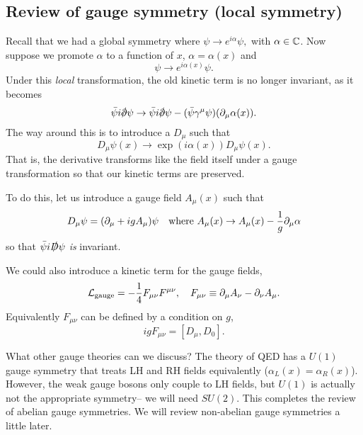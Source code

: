 \subsection*{Review of gauge symmetry (local symmetry)}
Recall that we had a global symmetry where $\psi \to e^{i\alpha}\psi,$ with $\alpha\in \mathbb{C}$. Now suppose we promote $\alpha$ to a function of $x$, $\alpha=\alpha(x)$ and
\begin{equation}
    \psi\to e^{i\alpha(x)}\psi.
\end{equation}
Under this \emph{local} transformation, the old kinetic term is no longer invariant, as it becomes
\begin{equation}
    \bar \psi i \slashed{\p}\psi \to \bar \psi i \slashed{\p}\psi - (\bar \psi \gamma^\mu \psi)(\p_\mu \alpha(x)).
\end{equation}
The way around this is to introduce a  $D_\mu$ such that
\begin{equation}
    D_\mu\psi(x) \to \exp(i\alpha(x))D_\mu \psi(x).
\end{equation}
That is, the derivative transforms like the field itself under a gauge transformation so that our kinetic terms are preserved.

To do this, let us introduce a gauge field $A_\mu(x)$ such that
\begin{equation}
    D_\mu\psi = (\partial_\mu + i g A_\mu)\psi\quad
    \text{where }A_\mu(x)\to A_\mu(x)-\frac{1}{g} \partial_\mu \alpha
\end{equation}
so that $\bar \psi i \slashed{D}\psi$ \emph{is} invariant.

We could also introduce a kinetic term for the gauge fields,
\begin{equation}
    \mathcal L_{\text{gauge}}=-\frac{1}{4} F_{\mu\nu} F^{\mu\nu}, \quad
    F_{\mu\nu}\equiv\partial_\mu A_\nu - \partial_\nu A_\mu.
\end{equation}
Equivalently $F_{\mu\nu}$ can be defined by a condition on $g$,
\begin{equation}
    ig F_{\mu\nu}=[D_\mu,D_0].
\end{equation}

What other gauge theories can we discuss? The theory of QED has a $U(1)$ gauge symmetry that treats LH and RH fields equivalently ($\alpha_L(x)=\alpha_R(x)$). However, the weak gauge bosons only couple to LH fields, but $U(1)$ is actually not the appropriate symmetry-- we will need $SU(2)$. This completes the review of abelian gauge symmetries. We will review non-abelian gauge symmetries a little later.

